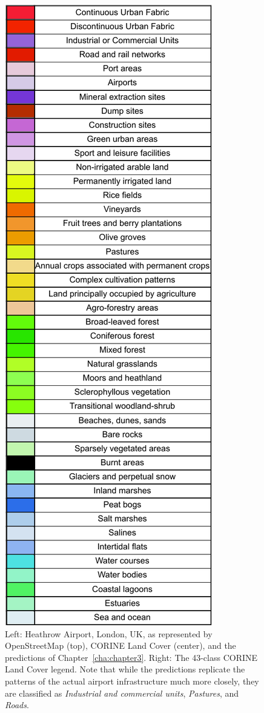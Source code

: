 \begin{figure}[H]
\begin{minipage}{0.5\textwidth}
                \includegraphics[width=\linewidth,height=2.15\textwidth,keepaspectratio]{figs_01/corine_legend.pdf}
                \caption{Left: Heathrow Airport, London, UK, as represented by OpenStreetMap (top), CORINE Land Cover (center), and the predictions of Chapter~\ref{cha:chapter3}. Right: The 43-class CORINE Land Cover legend. Note that while the predictions replicate the patterns of the actual airport infrastructure much more closely, they are classified as \textit{Industrial and commercial units}, \textit{Pastures}, and \textit{Roads}.}
                \label{fig:heathrow}
            \end{minipage}

        \end{figure}

